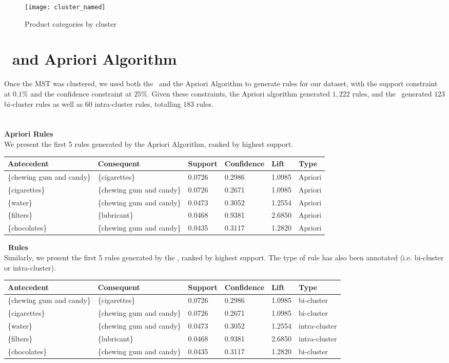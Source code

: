 \begin{figure}[H]
\centering
\texttt{[image: cluster\_named]}
\caption{Product categories by cluster}
\label{fig:cluster_named}
\end{figure}


\section{\algo\ and Apriori Algorithm}
Once the MST was clustered, we used both the \algo\ and the Apriori Algorithm to generate rules for our dataset, with the support constraint at $0.1\%$ and the confidence constraint at $25\%$. Given these constraints, the Apriori algorithm generated $1,222$ rules, and the \algo\ generated $123$ bi-cluster rules as well as $60$ intra-cluster rules, totalling $183$ rules.\\
\\\\\textbf{Apriori Rules}\\
We present the first 5 rules generated by the Apriori Algorithm, ranked by highest support.

\begin{longtable}
{@{}llllll@{}}\toprule Antecedent& Consequent& Support& Confidence& Lift& Type\\*\midrule\endfirsthead\endhead
\{chewing gum and candy\} & \{cigarettes\} & 0.0726 & 0.2986 & 1.0985 & Apriori\\
\{cigarettes\} & \{chewing gum and candy\} & 0.0726 & 0.2671 & 1.0985 & Apriori\\
\{water\} & \{chewing gum and candy\} & 0.0473 & 0.3052 & 1.2554 & Apriori\\
\{filters\} & \{lubricant\} & 0.0468 & 0.9381 & 2.6850 & Apriori\\
\{chocolates\} & \{chewing gum and candy\} & 0.0435 & 0.3117 & 1.2820 & Apriori\\
\midrule\end{longtable}

\noindent \textbf{\algo\ Rules}\\
Similarly, we present the first 5 rules generated by the \algo, ranked by highest support. The type of rule has also been annotated (i.e. bi-cluster or intra-cluster).

\begin{longtable}
{@{}llllll@{}}\toprule Antecedent& Consequent& Support& Confidence& Lift& Type\\*\midrule\endfirsthead\endhead
\{chewing gum and candy\} & \{cigarettes\} & 0.0726 & 0.2986 & 1.0985 & bi-cluster\\
\{cigarettes\} & \{chewing gum and candy\} & 0.0726 & 0.2671 & 1.0985 & bi-cluster\\
\{water\} & \{chewing gum and candy\} & 0.0473 & 0.3052 & 1.2554 & intra-cluster\\
\{filters\} & \{lubricant\} & 0.0468 & 0.9381 & 2.6850 & intra-cluster\\
\{chocolates\} & \{chewing gum and candy\} & 0.0435 & 0.3117 & 1.2820 & bi-cluster\\
\midrule\end{longtable}

